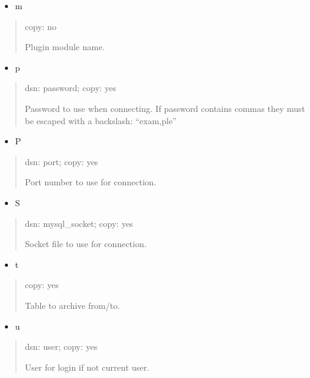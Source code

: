 \documentclass[letterpaper,10pt,english]{sphinxmanual}
\begin{document}
\begin{itemize}
\item {} 
\sphinxAtStartPar
m

\end{itemize}
\begin{quote}

\sphinxAtStartPar
copy: no

\sphinxAtStartPar
Plugin module name.
\end{quote}
\begin{itemize}
\item {} 
\sphinxAtStartPar
p

\end{itemize}
\begin{quote}

\sphinxAtStartPar
dsn: password; copy: yes

\sphinxAtStartPar
Password to use when connecting.
If password contains commas they must be escaped with a backslash: “exam,ple”
\end{quote}
\begin{itemize}
\item {} 
\sphinxAtStartPar
P

\end{itemize}
\begin{quote}

\sphinxAtStartPar
dsn: port; copy: yes

\sphinxAtStartPar
Port number to use for connection.
\end{quote}
\begin{itemize}
\item {} 
\sphinxAtStartPar
S

\end{itemize}
\begin{quote}

\sphinxAtStartPar
dsn: mysql\_socket; copy: yes

\sphinxAtStartPar
Socket file to use for connection.
\end{quote}
\begin{itemize}
\item {} 
\sphinxAtStartPar
t

\end{itemize}
\begin{quote}

\sphinxAtStartPar
copy: yes

\sphinxAtStartPar
Table to archive from/to.
\end{quote}
\begin{itemize}
\item {} 
\sphinxAtStartPar
u

\end{itemize}
\begin{quote}

\sphinxAtStartPar
dsn: user; copy: yes

\sphinxAtStartPar
User for login if not current user.
\end{quote}
\end{document}
